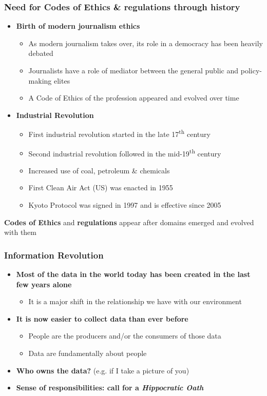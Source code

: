 \documentclass{beamer}
\begin{document}
\begin{frame}\frametitle{Need for Codes of Ethics \& regulations through history}
\begin{itemize}
	\setlength\itemsep{1em}
	\item {\bf Birth of modern journalism ethics}
	\begin{itemize}
		\item As modern journalism takes over, its role in a democracy has been heavily debated
		\item Journalists have a role of mediator between the general public and policy-making elites
		\item A Code of Ethics of the profession appeared and evolved over time
	\end{itemize}
	\item {\bf Industrial Revolution}
	\begin{itemize}
		\item First industrial revolution started in the late 17\textsuperscript{th} century
		\item Second industrial revolution followed in the mid-19\textsuperscript{th} century
		\item Increased use of coal, petroleum \& chemicals
		\item First Clean Air Act (US) was enacted in 1955
		\item Kyoto Protocol was signed in 1997 and is effective since 2005
	\end{itemize}
\end{itemize}
\begin{center}
{\bf Codes of Ethics} and {\bf regulations} appear after domains emerged and evolved with them
\end{center}
\end{frame}

\begin{frame}\frametitle{Information Revolution}
\begin{itemize}
	\setlength\itemsep{1em}
	\item {\bf Most of the data in the world today has been created in the last few years alone}
	\begin{itemize}
		\item It is a major shift in the relationship we have with our environment
	\end{itemize}
	\item {\bf It is now easier to collect data than ever before}
	\begin{itemize}
		\item People are the producers and/or the consumers of those data
		\item Data are fundamentally about people
	\end{itemize}
	\item {\bf Who owns the data?} (e.g. if I take a picture of you)
	\item {\bf Sense of responsibilities: call for a \textit{Hippocratic Oath}}
\end{itemize}
\end{frame}
\end{document}
